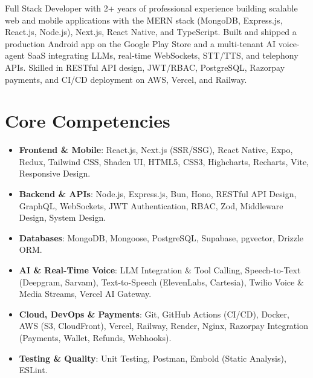 \documentclass[11pt,a4paper,sans]{moderncv}
\begin{document}
\makecvtitle


\vspace{4pt}
\small{Full Stack Developer with 2+ years of professional experience building scalable web and mobile applications with the MERN stack (MongoDB, Express.js, React.js, Node.js), Next.js, React Native, and TypeScript. Built and shipped a production Android app on the Google Play Store and a multi-tenant AI voice-agent SaaS integrating LLMs, real-time WebSockets, STT/TTS, and telephony APIs. Skilled in RESTful API design, JWT/RBAC, PostgreSQL, Razorpay payments, and CI/CD deployment on AWS, Vercel, and Railway.}


\section{Core Competencies}
\vspace{1pt}
\begin{itemize}
\item \textbf{Frontend \& Mobile}: React.js, Next.js (SSR/SSG), React Native, Expo, Redux, Tailwind CSS, Shadcn UI, HTML5, CSS3, Highcharts, Recharts, Vite, Responsive Design.
\item \textbf{Backend \& APIs}: Node.js, Express.js, Bun, Hono, RESTful API Design, GraphQL, WebSockets, JWT Authentication, RBAC, Zod, Middleware Design, System Design.
\item \textbf{Databases}: MongoDB, Mongoose, PostgreSQL, Supabase, pgvector, Drizzle ORM.
\item \textbf{AI \& Real-Time Voice}: LLM Integration \& Tool Calling, Speech-to-Text (Deepgram, Sarvam), Text-to-Speech (ElevenLabs, Cartesia), Twilio Voice \& Media Streams, Vercel AI Gateway.
\item \textbf{Cloud, DevOps \& Payments}: Git, GitHub Actions (CI/CD), Docker, AWS (S3, CloudFront), Vercel, Railway, Render, Nginx, Razorpay Integration (Payments, Wallet, Refunds, Webhooks).
\item \textbf{Testing \& Quality}: Unit Testing, Postman, Embold (Static Analysis), ESLint.
\end{itemize}

\end{document}
